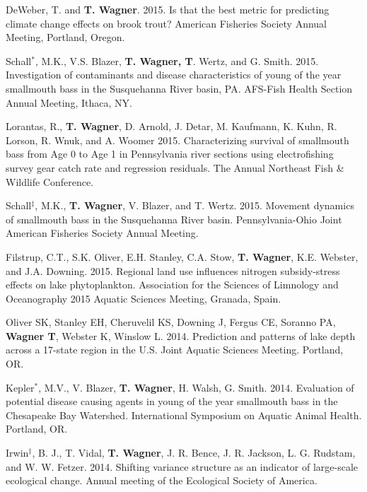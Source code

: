 \documentclass[10pt]{article}
\begin{document}
\begin{flushleft}
\begin{etaremune}
\item DeWeber, T. and {\bf T. Wagner}. 2015. Is that the best metric for predicting climate change effects on brook trout? American Fisheries Society Annual Meeting, Portland, Oregon.

\item Schall$^*$, M.K., V.S. Blazer, {\bf T. Wagner, T}. Wertz, and G. Smith.  2015. Investigation of contaminants and disease characteristics of young of the year smallmouth bass in the Susquehanna River basin, PA. AFS-Fish Health Section Annual Meeting, Ithaca, NY. 

\item Lorantas, R., {\bf T. Wagner}, D. Arnold, J. Detar, M. Kaufmann, K. Kuhn, R. Lorson, R. Wnuk, and A. Woomer 2015. Characterizing survival of smallmouth bass from Age 0 to Age 1 in Pennsylvania river sections using electrofishing survey gear catch rate and regression residuals.  The Annual Northeast Fish \& Wildlife Conference. 

\item Schall$^\ddagger$, M.K.,  {\bf T. Wagner}, V. Blazer, and T. Wertz. 2015. Movement dynamics of smallmouth bass in the Susquehanna River basin. Pennsylvania-Ohio Joint American Fisheries Society Annual Meeting.

\item Filstrup, C.T., S.K. Oliver, E.H. Stanley, C.A. Stow, {\bf T. Wagner}, K.E. Webster, and J.A. Downing. 2015. Regional land use influences nitrogen subsidy-stress effects on lake phytoplankton. Association for the Sciences of Limnology and Oceanography 2015 Aquatic Sciences Meeting, Granada, Spain. 


\item Oliver SK, Stanley EH, Cheruvelil KS, Downing J, Fergus CE, Soranno PA, {\bf Wagner T}, Webster K, Winslow L. 2014. Prediction and patterns of lake depth across a 17-state region in the U.S. Joint Aquatic Sciences Meeting. Portland, OR.

\item Kepler$^*$, M.V., V. Blazer, {\bf T. Wagner}, H. Walsh, G. Smith. 2014. Evaluation of potential disease causing agents in young of the year smallmouth bass in the Chesapeake Bay Watershed. International Symposium on Aquatic Animal Health. Portland, OR. 

\item Irwin$^\ddagger$, B. J., T. Vidal, {\bf T. Wagner}, J. R. Bence, J. R. Jackson, L. G. Rudstam, and W. W. Fetzer. 2014. Shifting variance structure as an indicator of large-scale ecological change. Annual meeting of the Ecological Society of America.


\end{etaremune}
\end{flushleft}
\end{document}
